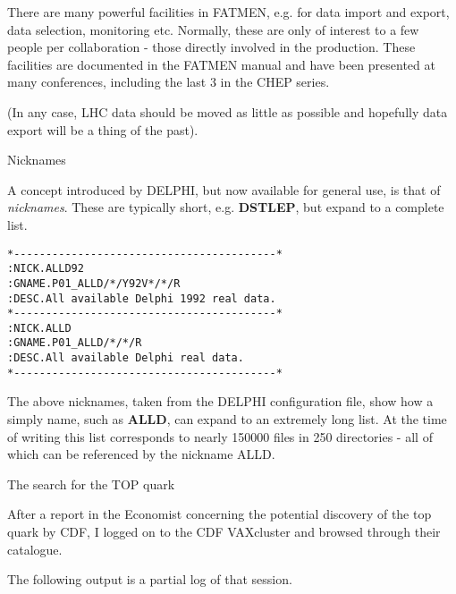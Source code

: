 \begin{slide}

There are many powerful facilities in FATMEN, e.g. for data import
and export, data selection, monitoring etc. Normally, these
are only of interest to a few people per collaboration - those
directly involved in the production. These facilities are documented
in the FATMEN manual and have been presented at many conferences,
including the last 3 in the CHEP series.

(In any case, LHC data should be moved as little as possible
and hopefully data export will be a thing of the past).

\end{slide}

\begin{slide}
\begin{center}Nicknames\end{center}
A concept introduced by DELPHI, but now available for general use,
is that of {\it nicknames}. These are typically short, e.g.
{\bf DSTLEP}, but expand to a complete list.

\end{slide}

\begin{slide}
\begin{verbatim}
*-----------------------------------------*                   
:NICK.ALLD92                                                            
:GNAME.P01_ALLD/*/Y92V*/*/R                                             
:DESC.All available Delphi 1992 real data.                              
*-----------------------------------------*                   
:NICK.ALLD                                                              
:GNAME.P01_ALLD/*/*/R                                                   
:DESC.All available Delphi real data.                                   
*-----------------------------------------*                   
\end{verbatim}
\end{slide}

\begin{slide}
The above nicknames, taken from the DELPHI configuration
file, show how a simply name, such as {\bf ALLD}, can
expand to an extremely long list. At the time of writing
this list corresponds to nearly 150000 files in 250 directories - all
of which can be referenced by the nickname ALLD.
\end{slide}

\begin{slide}
\begin{center}The search for the TOP quark\end{center}

After a report in the Economist concerning the potential discovery
of the top quark by CDF, I logged on to the CDF VAXcluster and
browsed through their catalogue.

The following output is a partial log of that session.

\end{slide}

